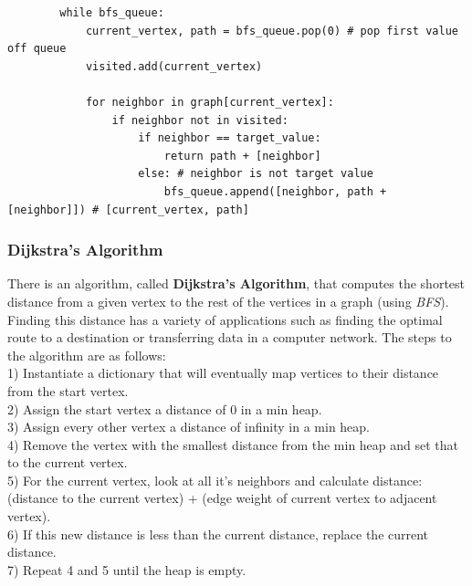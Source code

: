 \documentclass[11pt, a4paper]{article}
\begin{document}
\begin{spacing}{1.1}
\begin{lstlisting}
		while bfs_queue:
			current_vertex, path = bfs_queue.pop(0) # pop first value off queue
			visited.add(current_vertex)
			
			for neighbor in graph[current_vertex]:
				if neighbor not in visited:
					if neighbor == target_value:
						return path + [neighbor]
					else: # neighbor is not target value
						bfs_queue.append([neighbor, path + [neighbor]]) # [current_vertex, path] \end{lstlisting} \vspace*{2mm}
	
	\subsubsection{Dijkstra's Algorithm}
	There is an algorithm, called \textbf{Dijkstra’s Algorithm}, that computes the shortest distance from a given vertex to the rest of the vertices in a graph (using \textit{BFS}). Finding this distance has a variety of applications such as finding the optimal route to a destination or transferring data in a computer network. The steps to the algorithm are as follows: \vspace*{1mm} \\
	\hspace*{3mm} 1) Instantiate a dictionary that will eventually map vertices to their distance from the start vertex. \\
	\hspace*{3mm} 2) Assign the start vertex a distance of 0 in a min heap. \\
	\hspace*{3mm} 3) Assign every other vertex a distance of infinity in a min heap. \\
	\hspace*{3mm} 4) Remove the vertex with the smallest distance from the min heap and set that to the current vertex. \\
	\hspace*{3mm} 5) For the current vertex, look at all it's neighbors and calculate distance: (distance to the current \hspace*{8mm} vertex) + (edge weight of current vertex to adjacent vertex). \\
	\hspace*{3mm} 6) If this new distance is less than the current distance, replace the current distance. \\
	\hspace*{3mm} 7) Repeat 4 and 5 until the heap is empty. \\

\end{spacing}
\end{document}
